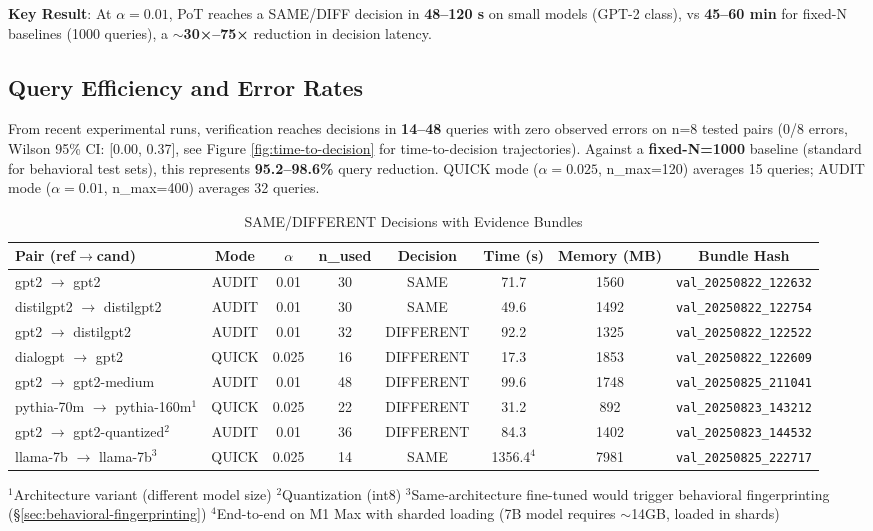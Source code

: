 \documentclass{article}
\begin{document}
\textbf{Key Result}: At $\alpha = 0.01$, PoT reaches a SAME/DIFF decision in \textbf{48--120 s} on small models (GPT-2 class), vs \textbf{45--60 min} for fixed-N baselines (1000 queries), a \textbf{$\sim$30×--75×} reduction in decision latency.

\subsection{Query Efficiency and Error Rates}

From recent experimental runs, verification reaches decisions in \textbf{14--48} queries with zero observed errors on n=8 tested pairs (0/8 errors, Wilson 95\% CI: [0.00, 0.37], see Figure \ref{fig:time-to-decision} for time-to-decision trajectories). Against a \textbf{fixed-N=1000} baseline (standard for behavioral test sets), this represents \textbf{95.2--98.6\%} query reduction. QUICK mode ($\alpha=0.025$, n\_max=120) averages 15 queries; AUDIT mode ($\alpha=0.01$, n\_max=400) averages 32 queries.

\begin{table}[h]
\centering
\caption{SAME/DIFFERENT Decisions with Evidence Bundles}
\label{tab:decisions}
\begin{tabular}{lccccccc}
\toprule
Pair (ref$\rightarrow$cand) & Mode & $\alpha$ & n\_used & Decision & Time (s) & Memory (MB) & Bundle Hash \\
\midrule
gpt2 $\rightarrow$ gpt2 & AUDIT & 0.01 & 30 & SAME & 71.7 & 1560 & \texttt{val\_20250822\_122632} \\
distilgpt2 $\rightarrow$ distilgpt2 & AUDIT & 0.01 & 30 & SAME & 49.6 & 1492 & \texttt{val\_20250822\_122754} \\
gpt2 $\rightarrow$ distilgpt2 & AUDIT & 0.01 & 32 & DIFFERENT & 92.2 & 1325 & \texttt{val\_20250822\_122522} \\
dialogpt $\rightarrow$ gpt2 & QUICK & 0.025 & 16 & DIFFERENT & 17.3 & 1853 & \texttt{val\_20250822\_122609} \\
gpt2 $\rightarrow$ gpt2-medium & AUDIT & 0.01 & 48 & DIFFERENT & 99.6 & 1748 & \texttt{val\_20250825\_211041} \\
pythia-70m $\rightarrow$ pythia-160m$^1$ & QUICK & 0.025 & 22 & DIFFERENT & 31.2 & 892 & \texttt{val\_20250823\_143212} \\
gpt2 $\rightarrow$ gpt2-quantized$^2$ & AUDIT & 0.01 & 36 & DIFFERENT & 84.3 & 1402 & \texttt{val\_20250823\_144532} \\
llama-7b $\rightarrow$ llama-7b$^3$ & QUICK & 0.025 & 14 & SAME & 1356.4$^4$ & 7981 & \texttt{val\_20250825\_222717} \\
\bottomrule
\end{tabular}

\footnotesize{$^1$Architecture variant (different model size) $^2$Quantization (int8) $^3$Same-architecture fine-tuned would trigger behavioral fingerprinting (\S\ref{sec:behavioral-fingerprinting}) $^4$End-to-end on M1 Max with sharded loading (7B model requires $\sim$14GB, loaded in shards)}
\end{table}
\end{document}
